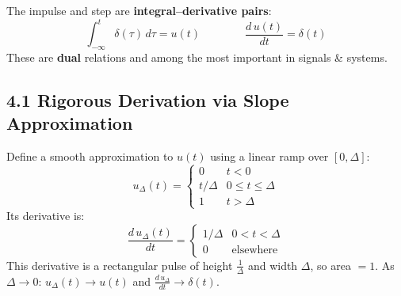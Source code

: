 \documentclass[10pt,a4paper]{article}
\begin{document}
\begin{defbox}
The impulse and step are \textbf{integral--derivative pairs}:
\[
  \boxed{\int_{-\infty}^{t}\delta(\tau)\,d\tau = u(t)}
  \qquad\qquad
  \boxed{\frac{d\,u(t)}{dt} = \delta(t)}
\]
These are \textbf{dual} relations and among the most important in signals \& systems.
\end{defbox}

\subsection*{4.1 Rigorous Derivation via Slope Approximation}

\begin{derivbox}
Define a smooth approximation to $u(t)$ using a linear ramp over $[0, \Delta]$:
\[
  u_\Delta(t) = \begin{cases} 0 & t < 0 \\ t/\Delta & 0 \leq t \leq \Delta \\ 1 & t > \Delta \end{cases}
\]
Its derivative is:
\[
  \frac{d\,u_\Delta(t)}{dt} = \begin{cases} 1/\Delta & 0 < t < \Delta \\ 0 & \text{elsewhere} \end{cases}
\]
This derivative is a rectangular pulse of height $\tfrac{1}{\Delta}$ and width $\Delta$, so area $= 1$.
As $\Delta\to0$: $u_\Delta(t)\to u(t)$ and $\tfrac{d\,u_\Delta}{dt}\to\delta(t)$.


\end{derivbox}
\end{document}
